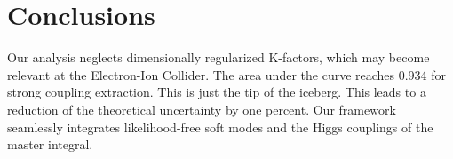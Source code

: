 \section{Conclusions}\label{sec:conclusions}

Our analysis neglects dimensionally regularized K-factors, which may
become relevant at the Electron-Ion Collider. The area under the curve
reaches 0.934 for strong coupling extraction. This is just the tip of
the iceberg. This leads to a reduction of the theoretical uncertainty by
one percent. Our framework seamlessly integrates likelihood-free soft
modes and the Higgs couplings of the master integral.

